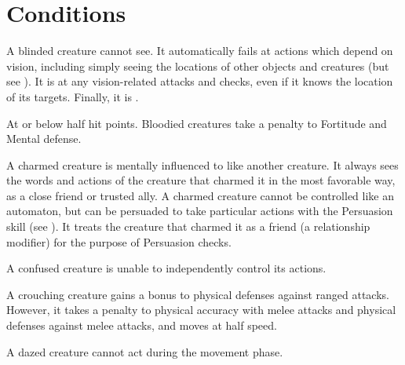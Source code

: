 \chapter{Conditions}\label{Conditions}

 A blinded creature cannot see. It automatically fails at actions which depend on vision, including simply seeing the locations of other objects and creatures (but see ). It is \severelyimpaired at any vision-related attacks and checks, even if it knows the location of its targets. Finally, it is .


 At or below half hit points. Bloodied creatures take a  penalty to Fortitude and Mental defense.

 A charmed creature is mentally influenced to like another creature.
It always sees the words and actions of the creature that charmed it in the most favorable way, as a close friend or trusted ally.
A charmed creature cannot be controlled like an automaton, but can be persuaded to take particular actions with the Persuasion skill (see ).
It treats the creature that charmed it as a friend (a  relationship modifier) for the purpose of Persuasion checks.


 A confused creature is unable to independently control its actions. \confusionexplanation

 A crouching creature gains a  bonus to physical defenses against ranged attacks.
However, it takes a  penalty to physical accuracy with melee attacks and physical defenses against melee attacks, and moves at half speed.

 A dazed creature cannot act during the movement phase.


